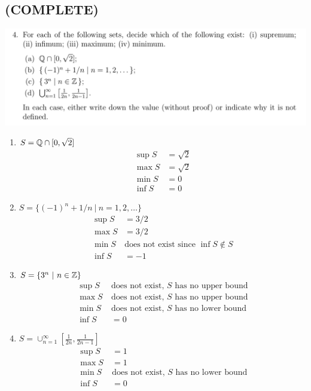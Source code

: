 \documentclass[12pt]{article}
\begin{document}
\subsection{(COMPLETE)}
\begin{mdframed}
  \includegraphics[width=400pt]{img/oxford-M2-analysis-I-2-4.png}
\end{mdframed}
\begin{enumerate}
\item $S = \mathbb{Q} \cap [0, \sqrt 2]$
  \begin{align*}
    \sup S &= \sqrt 2\\
    \max S &= \sqrt 2\\
    \min S &= 0\\
    \inf S &= 0
  \end{align*}
\item $S = \{(-1)^n + 1/n ~|~ n=1,2,\ldots\}$
  \begin{align*}
    \sup S &= 3/2\\
    \max S &= 3/2\\
    \min S ~&\text{does not exist since $\inf S \not\in S$}\\
    \inf S &= -1
  \end{align*}
\item $S = \{3^n ~|~ n \in \mathbb{Z}\}$
  \begin{align*}
    \sup S ~&\text{does not exist, $S$ has no upper bound}\\
    \max S ~&\text{does not exist, $S$ has no upper bound}\\
    \min S ~&\text{does not exist, $S$ has no lower bound}\\
    \inf S &= 0
  \end{align*}
\item $S = \cup_{n=1}^\infty [\frac{1}{2n}, \frac{1}{2n - 1}]$
  \begin{align*}
    \sup S ~&= 1\\
    \max S ~&= 1\\
    \min S ~&\text{does not exist, $S$ has no lower bound}\\
    \inf S ~&=0
  \end{align*}
\end{enumerate}
\end{document}
